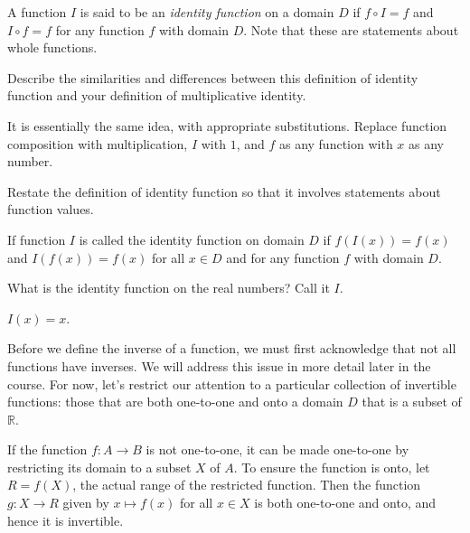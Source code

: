 \documentclass[space,handout,nooutcomes]{ximera}
\newcommand{\R}{\mathbb R}
\begin{document}
\begin{definition}
A function $I$ is said to be an \emph{identity function} on a domain $D$ if $f\circ I=f$ and $I\circ f = f$ for any function $f$ with domain $D$.  Note that these are statements about whole functions.  
\end{definition}

\begin{question}
Describe the similarities and differences between this definition of identity function and your definition of multiplicative identity.  
\begin{freeResponse}
\begin{hint}
It is essentially the same idea, with appropriate substitutions.  Replace function composition with multiplication, $I$ with $1$, and $f$ as any function with $x$ as any number.  
\end{hint}
\end{freeResponse}
\end{question}

\begin{question}
Restate the definition of identity function so that it involves statements about function values.  
\begin{freeResponse}
\begin{hint}
If function $I$ is called the identity function on domain $D$ if $f(I(x)) = f(x)$ and $I(f(x))=f(x)$ for all $x\in D$ and for any function $f$ with domain $D$.  
\end{hint}
\end{freeResponse}
\end{question}

\begin{question}
What is the identity function on the real numbers?  Call it $I$.  
\begin{freeResponse}
\begin{hint}
$I(x)=x$.
\end{hint}
\end{freeResponse}
\end{question}

Before we define the inverse of a function, we must first acknowledge that not all functions have inverses.  We will address this  issue in more detail later in the course.  For now, let's restrict our attention to a particular collection of invertible functions: those that are both one-to-one and onto a domain $D$ that is a subset of $\R$.  

\begin{remark}
If the function $f:A\rightarrow B$ is not one-to-one, it can be made one-to-one by restricting its domain to a subset $X$ of $A$.  To ensure the function is onto, let $R=f(X)$, the actual range of the restricted function.  Then the function $g:X\rightarrow R$ given by $x\mapsto f(x)$ for all $x\in X$ is both one-to-one and onto, and hence it is invertible.  
\end{remark}
\end{document}
